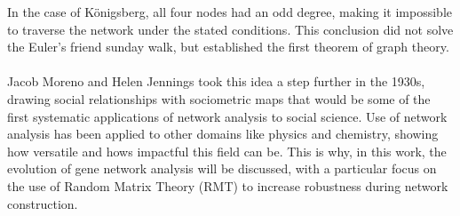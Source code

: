 \noindent In the case of Königsberg, all four nodes had an odd degree, making it impossible to traverse the network under the stated conditions.
This conclusion did not solve the Euler's friend sunday walk, but established the first theorem of graph theory.
\\\\
Jacob Moreno and Helen Jennings took this idea a step further in the 1930s, drawing social relationships with sociometric maps that would be some of the first systematic applications of network analysis to social science\cite{moreno_who_1934}.
Use of network analysis has been applied to other domains like physics\cite{kirchhoff_solution_1958} and chemistry\cite{arthur_mathematical_1896}, showing how versatile and hows impactful this field can be.
This is why, in this work, the evolution of gene network analysis will be discussed, with a particular focus on the use of Random Matrix Theory (RMT) to increase robustness during network construction.


